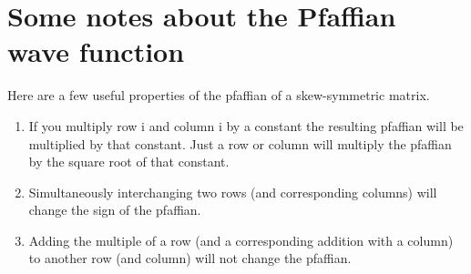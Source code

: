 \section{Some notes about the Pfaffian wave function}
Here are a few useful properties of the pfaffian of a skew-symmetric matrix.
\begin{enumerate}
   \item If you multiply row i and column i by a constant the resulting pfaffian will be multiplied by that constant. Just a row or column will multiply the pfaffian by the square root of that constant.
   \item Simultaneously interchanging two rows (and corresponding columns) will change the sign of the pfaffian.
   \item Adding the multiple of a row (and a corresponding addition with a column) to another row (and column) will not change the pfaffian.
\end{enumerate}


